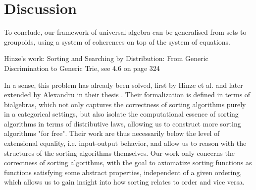 \section{Discussion}
\label{sec:discussion}

To conclude, our framework of universal algebra can be generalised from sets to groupoids, using a system of
coherences on top of the system of equations.

Hinze's work: Sorting and Searching by Distribution: From Generic Discrimination to Generic Trie, see 4.6 on page 324



In a sense, this problem has already been solved, first by Hinze et al. \cite{hinzeSortingBialgebrasDistributive2012}
and later extended by Alexandru in their thesis \cite{alexandruIntrinsicallyCorrectSorting2023}.
Their formalization is defined in terms of bialgebras, which not
only captures the correctness of sorting algorithms purely in a categorical settings, but
also isolate the computational essence of sorting algorithms in terms of distributive laws,
allowing us to construct more sorting algorithms "for free". Their work are thus necessarily
below the level of extensional equality, i.e. input-output behavior, and allow us to reason
with the structures of the sorting algorithms themselves. Our work only concerns the correctness
of sorting algorithms, with the goal to axiomatize sorting functions as functions satisfying
some abstract properties, independent of a given ordering, which allows us to gain
insight into how sorting relates to order and vice versa.
